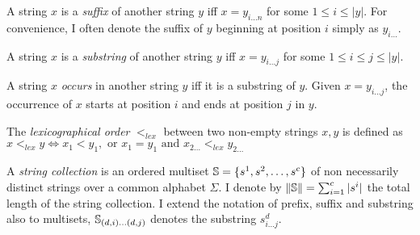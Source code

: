 \begin{definition}
A string $x$ is a \emph{suffix} of another string $y$ iff $x = y_{i \dots n}$ for some $1 \leq i \leq |y|$.
For convenience, I often denote the suffix of $y$ beginning at position $i$ simply as $y_{i \dots}$.
\end{definition}

\begin{definition} 
A string $x$ is a \emph{substring} of another string $y$ iff $x = y_{i \dots j}$ for some $1 \leq i \leq j \leq |y|$.
\end{definition}

\begin{definition}
A string $x$ \emph{occurs} in another string $y$ iff it is a substring of $y$.
Given $x = y_{i \dots j}$, the occurrence of $x$ starts at position $i$ and ends at position $j$ in $y$.
\end{definition}




\begin{definition}
\label{def:lex}
The \emph{lexicographical order} $<_{lex}$ between two non-empty strings $x,y$ is defined as $x <_{lex} y \iff x_1 < y_1, \text{ or } x_1 = y_1 \text{ and } x_{2 \dots} <_{lex} y_{2 \dots}$
\end{definition}

\begin{definition}
\label{def:colt}
A \emph{string collection} is an ordered multiset $\mathbb {S} = \{ s^1, s^2, \dots, s^c \}$ of non necessarily distinct strings over a common alphabet $\Sigma$.
I denote by $\left\lVert\mathbb {S}\right\rVert=\sum_{i=1}^{c}{|s^i|}$ the total length of the string collection.
I extend the notation of prefix, suffix and substring also to multisets, \eg $\mathbb {S}_{(d,i) \dots (d,j)}$ denotes the substring $s^d_{i \dots j}$.
\end{definition}

